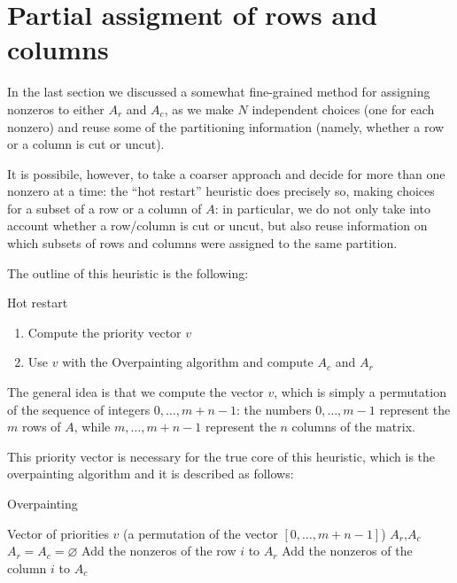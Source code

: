 \chapter{Partial assigment of rows and columns}

In the last section we discussed a somewhat fine-grained method for assigning nonzeros to either $A_r$ and $A_c$, as we make $N$ independent choices (one for each nonzero) and reuse some of the partitioning information (namely, whether a row or a column is cut or uncut).

It is possibile, however, to take a coarser approach and decide for more than one nonzero at a time: the ``hot restart'' heuristic does precisely so, making choices for a subset of a row or a column of $A$: in particular, we do not only take into account whether a row/column is cut or uncut, but also reuse information on which subsets of rows and columns were assigned to the same partition.

The outline of this heuristic is the following:

\begin{algorithm}[H]
 \caption{Hot restart}
 \begin{enumerate}[(1)]
  \item Compute the priority vector $v$
  \item Use $v$ with the Overpainting algorithm and compute $A_c$ and $A_r$
 \end{enumerate}
\end{algorithm}

The general idea is that we compute the vector $v$, which is simply a permutation of the sequence of integers $0,\dots,m+n-1$: the numbers $0,\dots,m-1$ represent the $m$ rows of $A$, while $m,\dots,m+n-1$ represent the $n$ columns of the matrix.

This priority vector is necessary for the true core of this heuristic, which is the overpainting algorithm and it is described  as follows:

\begin{algorithm}[H]
\caption{Overpainting} \label{alg:overpainting}
\begin{algorithmic}
\STATE
\REQUIRE Vector of priorities $v$ (a permutation of the vector $[0,\dots,m+n-1]$)
\ENSURE $A_r$,$A_c$
\STATE
\STATE $A_r = A_c = \varnothing$
\STATE Add the nonzeros of the row $i$ to $A_r$
\ELSE
\STATE Add the nonzeros of the column $i$ to $A_c$
\ENDIF
\ENDFOR
\end{algorithmic}
\end{algorithm}

